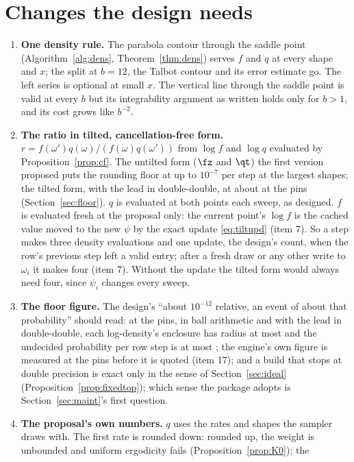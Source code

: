 \section{Changes the design needs}\label{sec:changes}

\begin{enumerate}
\item \textbf{One density rule.} The parabola contour through the saddle point (Algorithm~\ref{alg:dens},
Theorem~\ref{thm:dens}) serves $f$ and $q$ at every shape and $x$; the split at $b=12$, the Talbot contour and its
error estimate go. The left series is optional at small $x$. The vertical line through the saddle point is valid at
every $b$ but its integrability argument as written holds only for $b>1$, and its cost grows like $b^{-2}$.
\item \textbf{The ratio in tilted, cancellation-free form.} $r=f(\omega')q(\omega)/(f(\omega)q(\omega'))$ from
$\log f$ and $\log q$ evaluated by Proposition~\ref{prop:cf}. The untilted form ($\fz$ and $\qt$) the first version
proposed puts the rounding floor at up to $10^{-7}$ per step at the largest shapes; the tilted form, with the
lead in double-double, at about \FLOORSTEP{} at the pins (Section~\ref{sec:floor}). $q$ is evaluated at both points
each sweep, as designed. $f$ is evaluated fresh at the proposal only: the current point's $\log f$ is the cached
value moved to the new $\psi$ by the exact update \eqref{eq:tiltupd} (item 7). So a step makes three density
evaluations and one update, the design's count, when the row's previous step left a valid entry; after a fresh draw
or any other write to $\omega_i$ it makes four (item 7). Without the update the tilted form would always need four,
since $\psi_i$ changes every sweep.
\item \textbf{The floor figure.} The design's ``about $10^{-12}$ relative, an event of about that probability''
should read: at the pins, in ball arithmetic and with the lead in double-double, each log-density's enclosure has
radius at most \FLOORDENS{} and the undecided probability per row step is at most \FLOORSTEP; the engine's own
figure is measured at the pins before it is quoted (item 17); and a build that stops at double precision is exact only in the sense of
Section~\ref{sec:ideal} (Proposition~\ref{prop:fixedtop}); which sense the package adopts is
Section~\ref{sec:maint}'s first question.
\item \textbf{The proposal's own numbers.} $q$ uses the rates and shapes the sampler draws with. The first rate is
rounded down: rounded up, the weight is unbounded and uniform ergodicity fails (Proposition~\ref{prop:K0}); the

\end{enumerate}

